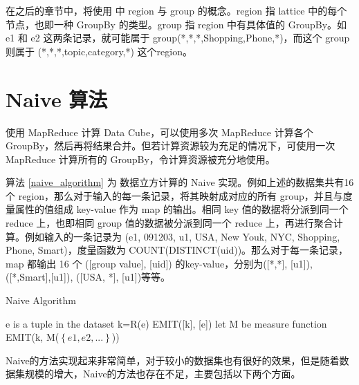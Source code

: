 在之后的章节中，将使用 \cite{nandi2011distributed} 中 region 与 group 的概念。region 指 lattice 中的每个节点，也即一种 GroupBy 的类型。group 指 region 中有具体值的 GroupBy。如 e1 和 e2 这两条记录，就可能属于 group(*,*,*,Shopping,Phone,*)，而这个 group 则属于 (*,*,*,topic,category,*) 这个region。

\section{Naive 算法}

使用 MapReduce 计算 Data Cube，可以使用多次 MapReduce 计算各个 GroupBy，然后再将结果合并。但若计算资源较为充足的情况下，可使用一次 MapReduce 计算所有的 GroupBy，令计算资源被充分地使用。

算法 \ref{naive_algorithm} 为 数据立方计算的 Naive 实现。例如上述的数据集共有16个 region，那么对于输入的每一条记录，将其映射成对应的所有 group，并且与度量属性的值组成 key-value 作为 map 的输出。相同 key 值的数据将分派到同一个 reduce 上，也即相同 group 值的数据被分派到同一个 reduce 上，再进行聚合计算。例如输入的一条记录为 (e1, 091203, u1, USA, New Youk, NYC, Shopping, Phone, Smart)，度量函数为 COUNT(DISTINCT(uid))。那么对于每一条记录，map 都输出 16 个 ([group value], [uid]) 的key-value，分别为([*,*], [u1]), ([*,Smart],[u1]), ([USA, *], [u1])等等。

{\renewcommand\baselinestretch{1} 
\begin{algorithm}[!ht]
\caption{Naive Algorithm}
\label{naive_algorithm}
{\fontfamily{\familydefault}\selectfont

	\begin{algorithmic}[1] %
    	\State e is a tuple in the dataset
        	\State k=R(e)
        	\State EMIT([k], [e])
        \EndFor
   	 \EndFunction
     \State
     	\State let M be measure function
        \State EMIT(k, M($\left\{ e1,e2,...\right\}$))
     \EndFunction
	\end{algorithmic}
}
\end{algorithm}
\par}

Naive的方法实现起来非常简单，对于较小的数据集也有很好的效果，但是随着数据集规模的增大，Naive的方法也存在不足，主要包括以下两个方面。

